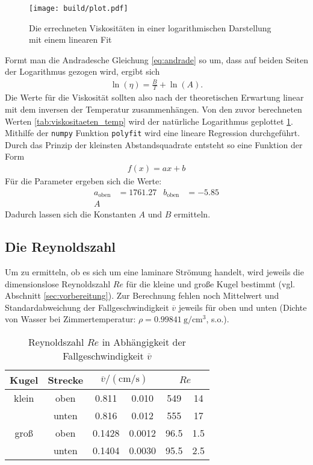 \begin{figure}
    \centering
    \texttt{[image: build/plot.pdf]}
    \caption{Die errechneten Viskositäten in einer logarithmischen Darstellung mit einem linearen Fit}
    \label{fig:groKu_steigendeTemp_eta_fit}
\end{figure}
%
\noindent
Formt man die Andradesche Gleichung \eqref{eq:andrade} so um, dass auf beiden Seiten der Logarithmus gezogen wird, ergibt sich
\begin{align}
    \ln {\left( \eta \right)} = \frac{B}{T} + \ln{\left( A \right)}.
\end{align}
Die Werte für die Viskosität sollten also nach der theoretischen Erwartung linear mit dem inversen der Temperatur zusammenhängen.
Von den zuvor berechneten Werten \ref{tab:viskositaeten_temp} wird der natürliche Logarithmus geplottet \ref{fig:groKu_steigendeTemp_eta_fit}.
Mithilfe der \texttt{numpy} Funktion \texttt{polyfit} wird eine lineare Regression durchgeführt.
Durch das Prinzip der kleinsten Abstandsquadrate entsteht so eine Funktion der Form
\begin{align*}
    f(x) = ax + b
\end{align*}
Für die Parameter ergeben sich die Werte:
\begin{align*}
    a_\text{oben} &= 1761.27 & b_\text{oben} &= -5.85 \\
    A
\end{align*}
Dadurch lassen sich die Konstanten $A$ und $B$ ermitteln.


\subsection[]{Die Reynoldszahl}
Um zu ermitteln, ob es sich um eine laminare Strömung handelt, wird jeweils die dimensionslose Reynoldszahl $Re$ für die kleine und große Kugel bestimmt
(vgl. Abschnitt \ref{sec:vorbereitung}).
Zur Berechnung fehlen noch Mittelwert und Standardabweichung der Fallgeschwindigkeit $\overline{v}$ jeweils für oben und unten
(Dichte von Wasser bei Zimmertemperatur: $\rho = \qty{0.99841}{\g \per \cm^3}$, s.o.).

\begin{table}
    \caption[]{Reynoldszahl $Re$ in Abhängigkeit der Fallgeschwindigkeit $\overline{v}$}
    \label{tab:reynold}
    \centering
    \begin{tabular}[]{S S S[table-format=1.4] @{${}\pm{}$} S[table-format=1.4] S[table-format=4.1] @{${}\pm{}$} S[table-format=3.1]}
        \toprule
        {Kugel} & {Strecke} &  &  \\
        \bottomrule
        {klein} & {oben} & 0.811 & 0.010 & 549 & 14 \\
         & {unten} & 0.816 & 0.012 & 555 & 17 \\
        {groß} & {oben} & 0.1428 & 0.0012 & 96.5 & 1.5 \\
         & {unten} & 0.1404 & 0.0030 & 95.5 & 2.5 \\
    \end{tabular}
\end{table}

